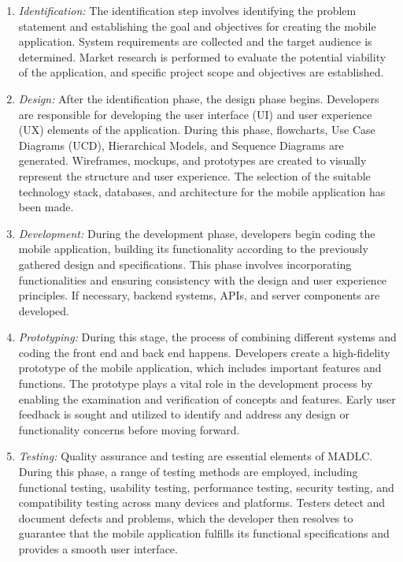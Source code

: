 \begin{enumerate}[1.]
    \item \textit{Identification:} The identification step involves identifying the problem statement and establishing the goal and objectives for creating the mobile application. System requirements are collected and the target audience is determined. Market research is performed to evaluate the potential viability of the application, and specific project scope and objectives are established.
    \item \textit{Design:} After the identification phase, the design phase begins. Developers are responsible for developing the user interface (UI) and user experience (UX) elements of the application. During this phase, flowcharts, Use Case Diagrams (UCD), Hierarchical Models, and Sequence Diagrams are generated. Wireframes, mockups, and prototypes are created to visually represent the structure and user experience. The selection of the suitable technology stack, databases, and architecture for the mobile application has been made.
    \item \textit{Development:} During the development phase, developers begin coding the mobile application, building its functionality according to the previously gathered design and specifications. This phase involves incorporating functionalities and ensuring consistency with the design and user experience principles. If necessary, backend systems, APIs, and server components are developed.
    \item \textit{Prototyping:} During this stage, the process of combining different systems and coding the front end and back end happens. Developers create a high-fidelity prototype of the mobile application, which includes important features and functions. The prototype plays a vital role in the development process by enabling the examination and verification of concepts and features. Early user feedback is sought and utilized to identify and address any design or functionality concerns before moving forward.
    \item \textit{Testing:} Quality assurance and testing are essential elements of MADLC. During this phase, a range of testing methods are employed, including functional testing, usability testing, performance testing, security testing, and compatibility testing across many devices and platforms. Testers detect and document defects and problems, which the developer then resolves to guarantee that the mobile application fulfills its functional specifications and provides a smooth user interface.
\end{enumerate}

